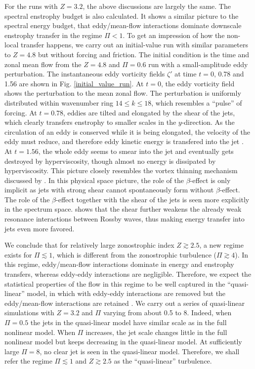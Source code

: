\documentclass{ametsoc}
\begin{document}
For the runs with $Z=3.2$, the above discussions are largely the
same. The spectral enstrophy budget is also calculated. It shows a
similar picture to the spectral energy budget, that eddy/mean-flow
interactions dominate downscale enstrophy transfer in the regime $\Pi<1$.
To get an impression of how the non-local transfer happens, we carry
out an initial-value run with similar parameters to $Z=4.8$ but without
forcing and friction. The initial condition is the time and zonal mean
flow from the $Z=4.8$ and $\Pi=0.6$ run with a small-amplitude eddy
perturbation. The instantaneous eddy vorticity fields $\zeta'$ at
time $t=0$, 0.78 and 1.56 are shown in Fig. \ref{initial_value_run}.
At $t=0$, the eddy vorticity field shows the perturbation to the
mean zonal flow. The perturbation is uniformly distributed within
wavenumber ring $14\leq k\leq18$, which resembles a ``pulse'' of
forcing. At $t=0.78$, eddies are tilted and elongated by the shear
of the jets, which clearly transfers enstrophy to smaller scales in the
$y$-direction. As the circulation of an eddy is conserved while it
is being elongated, the velocity of the eddy must reduce, and therefore
eddy kinetic energy is transfered into the jet \citep{Kraichnan1976}.
At $t=1.56$, the whole eddy seems to smear into the jet and eventually
gets destroyed by hyperviscosity, though almost no energy is dissipated
by hyperviscosity. This picture closely resembles the vortex thinning
mechanism discussed by \citet{Manz2009}. In this physical space picture,
the role of the $\beta$-effect is only implicit as jets with strong shear
cannot spontaneously form without $\beta$-effect. The role of the $\beta$-effect
together with the shear of the jets is seen more explicitly in the
spectrum space. \citet{Gurcan2012} shows that the shear further weakens
the already weak resonance interactions between Rossby waves, thus
making energy transfer into jets even more favored.

We conclude that for relatively large zonostrophic index $Z\apprge2.5$,
a new regime exists for $\Pi\apprle1$, which is different from the
zonostrophic turbulence ($\Pi\apprge4$). In this regime, eddy/mean-flow
interactions dominate in energy and enstrophy transfers, whereas eddy-eddy
interactions are negligible. Therefore, we expect the statistical
properties of the flow in this regime to be well captured in the ``quasi-linear''
model, in which with eddy-eddy interactions are removed but the eddy/mean-flow
interactions are retained \citep{O'Gorman2007,Tobias2013}. We carry
out a series of quasi-linear simulations with $Z=3.2$ and $\Pi$
varying from about 0.5 to 8. Indeed, when $\Pi=0.5$ the jets in the
quasi-linear model have similar scale as in the full nonlinear
model. When $\Pi$ increases, the jet scale changes little in the
full nonlinear model but keeps decreasing in the quasi-linear model.
At sufficiently large $\Pi=8$, no clear jet is seen in the quasi-linear
model. Therefore, we shall refer the regime $\Pi\apprle1$ and $Z\apprge2.5$
as the ``quasi-linear'' turbulence.
\end{document}
